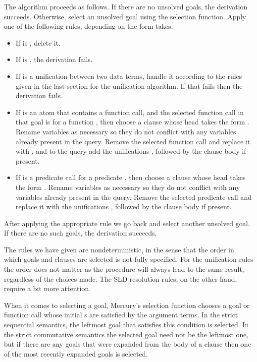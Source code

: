 The algorithm proceeds as follows.
If there are no unsolved goals, the derivation succeeds.
Otherwise, select an unsolved goal 
using the selection function.
Apply one of the following rules,
depending on the form  takes.
\begin{itemize}
\item
If  is ,
delete it.
\item
If  is ,
the derivation fails.
\item
If  is
a unification between two data terms,
handle it according to the rules
given in the last section
for the unification algorithm.
If that fails then the derivation fails.
\item
If  is an atom
that contains a function call,
and the selected function call in that goal is
 for a function ,
then choose a clause
whose head takes the form .
Rename variables as necessary so
they do not conflict with
any variables already present in the query.
Remove the selected function call
and replace it with ,
and to the query add
the unifications ,
followed by the clause body if present.
\item
If  is
a predicate call 
for a predicate ,
then choose a clause
whose head takes the form .
Rename variables as necessary so
they do not conflict with
any variables already present in the query.
Remove the selected predicate call
and replace it with
the unifications ,
followed by the clause body if present.
\end{itemize}
After applying the appropriate rule
we go back and select another unsolved goal.
If there are no such goals,
the derivation succeeds.

The rules we have given are nondeterministic,
in the sense that
the order in which goals and clauses are selected
is not fully specified.
For the unification rules the order does not matter
as the procedure will always lead to the same result,
regardless of the choices made.
The SLD resolution rules, on the other hand,
require a bit more attention.

When it comes to selecting a goal,
Mercury's selection function chooses a goal or function call
whose initial s
are satisfied by the argument terms.
In the strict sequential semantics,
the leftmost goal that satisfies this condition is selected.
In the strict commutative semantics
the selected goal need not be the leftmost one,
but if there are any goals
that were expanded from the body of a clause
then one of the most recently expanded goals is selected.

